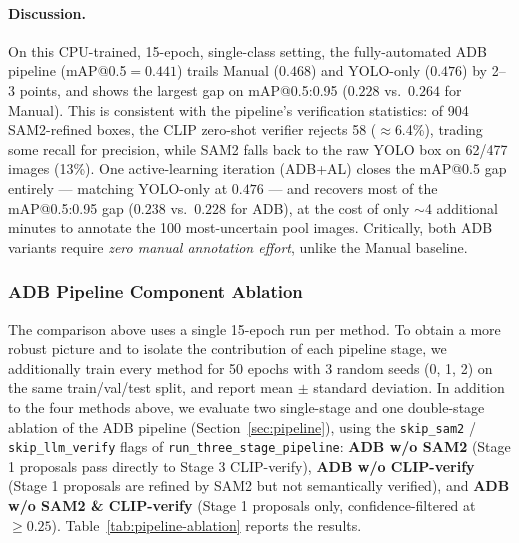 \documentclass[11pt]{article}
\begin{document}
\paragraph{Discussion.} On this CPU-trained, 15-epoch, single-class setting,
the fully-automated ADB pipeline (mAP@0.5$=0.441$) trails Manual ($0.468$)
and YOLO-only ($0.476$) by 2--3 points, and shows the largest gap on
mAP@0.5:0.95 ($0.228$ vs.\ $0.264$ for Manual). This is consistent with the
pipeline's verification statistics: of 904 SAM2-refined boxes, the CLIP
zero-shot verifier rejects 58 ($\approx$6.4\%), trading some recall for
precision, while SAM2 falls back to the raw YOLO box on 62/477 images
(13\%). One active-learning iteration (ADB+AL) closes the mAP@0.5 gap
entirely --- matching YOLO-only at $0.476$ --- and recovers most of the
mAP@0.5:0.95 gap ($0.238$ vs.\ $0.228$ for ADB), at the cost of only
$\sim$4 additional minutes to annotate the 100 most-uncertain pool images.
Critically, both ADB variants require \emph{zero manual annotation effort},
unlike the Manual baseline.

\subsubsection{ADB Pipeline Component Ablation}
\label{sec:pipeline-ablation}

The comparison above uses a single 15-epoch run per method. To obtain a more
robust picture and to isolate the contribution of each pipeline stage, we
additionally train every method for 50 epochs with 3 random seeds (0, 1, 2)
on the same train/val/test split, and report mean $\pm$ standard deviation.
In addition to the four methods above, we evaluate two single-stage and one
double-stage ablation of the ADB pipeline (Section~\ref{sec:pipeline}),
using the \texttt{skip\_sam2} / \texttt{skip\_llm\_verify} flags of
\texttt{run\_three\_stage\_pipeline}: \textbf{ADB w/o SAM2} (Stage 1
proposals pass directly to Stage 3 CLIP-verify), \textbf{ADB w/o
CLIP-verify} (Stage 1 proposals are refined by SAM2 but not semantically
verified), and \textbf{ADB w/o SAM2 \& CLIP-verify} (Stage 1 proposals only,
confidence-filtered at $\geq 0.25$). Table~\ref{tab:pipeline-ablation} reports
the results.
\end{document}
